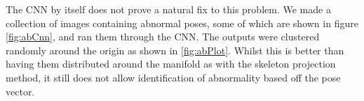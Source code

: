 \documentclass[11pt]{article} %
\begin{document}
The CNN by itself does not prove a natural fix to this problem. We made a collection of images containing abnormal poses, some of which are shown in figure \ref{fig:abCnn}, and ran them through the CNN. The outputs were clustered randomly around the origin as shown in \ref{fig:abPlot}. Whilst this is better than having them distributed around the manifold as with the skeleton projection method, it still does not allow identification of abnormality based off the pose vector.
\begin{figure}
\centering
{}
\qquad%
\qquad%
\qquad%
\qquad%
\subfloat[\label{fig:abPlot} ]{{
}}
\end{figure}
\end{document}
